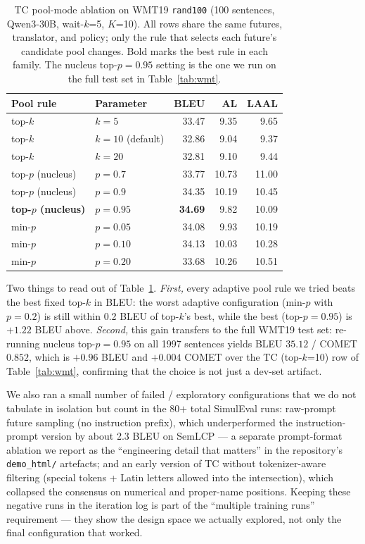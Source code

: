 \documentclass{article}
\begin{document}
\begin{table}[t]
\caption{TC pool-mode ablation on WMT19 \texttt{rand100} (100 sentences, Qwen3-30B, wait-$k$=5,
$K$=10). All rows share the same futures, translator, and policy; only the rule that selects
each future's candidate pool changes. Bold marks the best rule in each family. The nucleus
top-$p{=}0.95$ setting is the one we run on the full test set in Table~\ref{tab:wmt}.}
\label{tab:poolmode}
\centering
\small
\begin{tabular}{llrrr}
  \toprule
  Pool rule & Parameter & BLEU & AL & LAAL \\
  \midrule
  top-$k$        & $k=5$            & 33.47 & 9.35 & 9.65 \\
  top-$k$        & $k=10$ (default) & 32.86 & 9.04 & 9.37 \\
  top-$k$        & $k=20$           & 32.81 & 9.10 & 9.44 \\
  \midrule
  top-$p$ (nucleus) & $p=0.7$          & 33.77 & 10.73 & 11.00 \\
  top-$p$ (nucleus) & $p=0.9$          & 34.35 & 10.19 & 10.45 \\
  \textbf{top-$p$ (nucleus)} & $p=0.95$         & \textbf{34.69} & 9.82  & 10.09 \\
  \midrule
  min-$p$        & $p=0.05$         & 34.08 & 9.93  & 10.19 \\
  min-$p$        & $p=0.10$         & 34.13 & 10.03 & 10.28 \\
  min-$p$        & $p=0.20$         & 33.68 & 10.26 & 10.51 \\
  \bottomrule
\end{tabular}
\end{table}

Two things to read out of Table~\ref{tab:poolmode}. \emph{First,} every adaptive pool rule we
tried beats the best fixed top-$k$ in BLEU: the worst adaptive configuration (min-$p$ with
$p{=}0.2$) is still within 0.2 BLEU of top-$k$'s best, while the best (top-$p{=}0.95$) is
$+1.22$ BLEU above. \emph{Second,} this gain transfers to the full WMT19 test set: re-running
nucleus top-$p{=}0.95$ on all 1997 sentences yields BLEU $35.12$ / COMET $0.852$, which is
$+0.96$ BLEU and $+0.004$ COMET over the TC (top-$k$=10) row of Table~\ref{tab:wmt}, confirming
that the choice is not just a dev-set artifact.

We also ran a small number of failed / exploratory configurations that we do not tabulate in
isolation but count in the 80$+$ total SimulEval runs: raw-prompt future sampling (no instruction
prefix), which underperformed the instruction-prompt version by about 2.3 BLEU on SemLCP --- a
separate prompt-format ablation we report as the ``engineering detail that matters'' in the
repository's \texttt{demo\_html/} artefacts; and an early version of TC without tokenizer-aware
filtering (special tokens + Latin letters allowed into the intersection), which collapsed the
consensus on numerical and proper-name positions. Keeping these negative runs in the iteration
log is part of the ``multiple training runs'' requirement --- they show the design space we
actually explored, not only the final configuration that worked.
\end{document}
